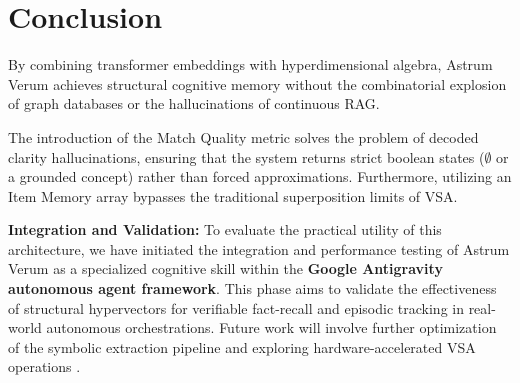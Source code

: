\documentclass[11pt,letterpaper]{article}
\begin{document}
\section{Conclusion}
By combining transformer embeddings
 with hyperdimensional algebra, Astrum Verum achieves structural cognitive memory without the combinatorial explosion of graph databases or the hallucinations of continuous RAG. 

The introduction of the Match Quality metric solves the problem of decoded clarity hallucinations, ensuring that the system returns strict boolean states ($\emptyset$ or a grounded concept) rather than forced approximations. Furthermore, utilizing an Item Memory array bypasses the traditional superposition limits of VSA. 

\textbf{Integration and Validation:} To evaluate the practical utility of this architecture, we have initiated the integration and performance testing of Astrum Verum as a specialized cognitive skill within the \textbf{Google Antigravity autonomous agent framework}. This phase aims to validate the effectiveness of structural hypervectors for verifiable fact-recall and episodic tracking in real-world autonomous orchestrations. Future work will involve further optimization of the symbolic extraction pipeline and exploring hardware-accelerated VSA operations \cite{kleyko2022vector}.




\end{document}
